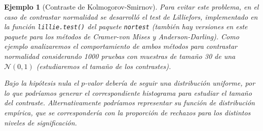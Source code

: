 \documentclass[
]{book}
\newenvironment{Shaded}{\begin{snugshade}}{\end{snugshade}}
\newcommand{\CommentTok}[1]{\textcolor[rgb]{0.56,0.35,0.01}{\textit{#1}}}
\newcommand{\ControlFlowTok}[1]{\textcolor[rgb]{0.13,0.29,0.53}{\textbf{#1}}}
\newcommand{\DecValTok}[1]{\textcolor[rgb]{0.00,0.00,0.81}{#1}}
\newcommand{\FunctionTok}[1]{\textcolor[rgb]{0.13,0.29,0.53}{\textbf{#1}}}
\newcommand{\NormalTok}[1]{#1}
\newcommand{\OtherTok}[1]{\textcolor[rgb]{0.56,0.35,0.01}{#1}}
\newcommand{\SpecialCharTok}[1]{\textcolor[rgb]{0.81,0.36,0.00}{\textbf{#1}}}
\newcommand{\StringTok}[1]{\textcolor[rgb]{0.31,0.60,0.02}{#1}}
\theoremstyle{break}
\newtheorem{example}{Ejemplo}[chapter]
\theoremstyle{nonumberplain}
\renewcommand{\CommentTok}[1]{\textcolor[rgb]{0.41,0.41,0.41}{\texttt{#1}}}
\begin{document}
\begin{example}[Contraste de Kolmogorov-Smirnov]
Para evitar este problema, en el caso de contrastar normalidad se desarrolló el test
de Lilliefors, implementado en la función \texttt{lillie.test()} del paquete \texttt{nortest}
(también hay versiones en este paquete para los métodos de Cramer-von Mises y
Anderson-Darling). Como ejemplo analizaremos el comportamiento de ambos métodos
para contrastar normalidad considerando 1000 pruebas con muestras de tamaño 30 de
una \(\mathcal{N}(0,1)\) (estudiaremos el \emph{tamaño de los contrastes}).

\begin{Shaded}
\end{Shaded}

Bajo la hipótesis nula el \(p\)-valor debería de seguir una distribución uniforme,
por lo que podríamos generar el correspondiente histograma para estudiar el
tamaño del contraste. Alternativamente podríamos representar su función de
distribución empírica, que se correspondería con la proporción de rechazos
para los distintos niveles de significación.


\end{example}
\end{document}

